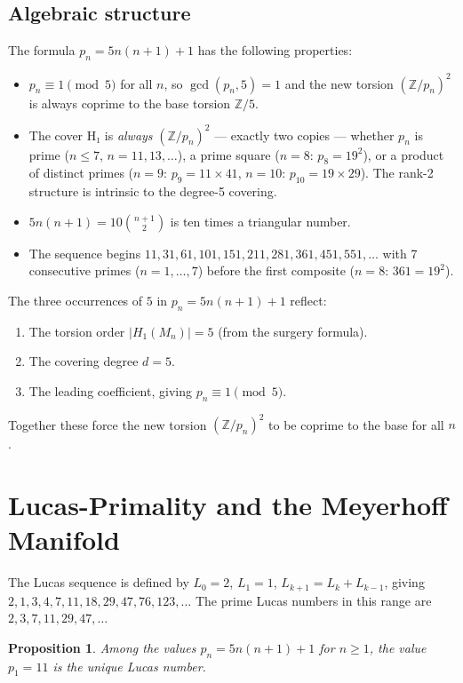 \documentclass[11pt,a4paper]{article}
\newtheorem{proposition}[theorem]{Proposition}
\theoremstyle{definition}
\newcommand{\ZZ}{\mathbb{Z}}
\newcommand{\Zfive}{\ZZ/5}
\newcommand{\Mn}{M_n}
\begin{document}
\subsection{Algebraic structure}

The formula $p_n = 5n(n+1)+1$ has the following properties:
\begin{itemize}
\item $p_n \equiv 1 \pmod{5}$ for all $n$,
  so $\gcd(p_n,5)=1$ and the new torsion $(\ZZ/p_n)^2$
  is always coprime to the base torsion $\Zfive$.
\item The cover H₁ is \emph{always} $(\ZZ/p_n)^2$ — exactly
  two copies — whether $p_n$ is prime ($n \leq 7$, $n=11,13,\ldots$),
  a prime square ($n=8$: $p_8=19^2$),
  or a product of distinct primes ($n=9$: $p_9=11\times41$,
  $n=10$: $p_{10}=19\times29$).
  The rank-2 structure is intrinsic to the degree-5 covering.
\item $5n(n+1) = 10\binom{n+1}{2}$ is ten times a triangular number.
\item The sequence begins $11, 31, 61, 101, 151, 211, 281,
  361, 451, 551, \ldots$
  with 7 consecutive primes ($n=1,\ldots,7$) before the first
  composite ($n=8$: $361=19^2$).
\end{itemize}

The three occurrences of $5$ in $p_n = 5n(n+1)+1$ reflect:
\begin{enumerate}
\item The torsion order $|H_1(\Mn)| = 5$ (from the surgery formula).
\item The covering degree $d=5$.
\item The leading coefficient, giving $p_n \equiv 1 \pmod 5$.
\end{enumerate}
Together these force the new torsion $(\ZZ/p_n)^2$ to be coprime
to the base for all $n$.

\section{Lucas-Primality and the Meyerhoff Manifold}
\label{sec:lucas}

The Lucas sequence is defined by $L_0=2$, $L_1=1$,
$L_{k+1}=L_k+L_{k-1}$, giving
$2,1,3,4,7,11,18,29,47,76,123,\ldots$
The prime Lucas numbers in this range are $2,3,7,11,29,47,\ldots$

\begin{proposition}
Among the values $p_n = 5n(n+1)+1$ for $n \geq 1$,
the value $p_1 = 11$ is the unique Lucas number.
\end{proposition}
\end{document}
